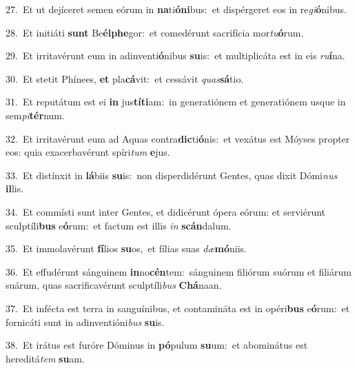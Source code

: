 {\numbfont\textcolor{\numbcolor}{27.}}~Et ut dejíceret semen eórum in \textbf{na}\-ti\-\textbf{ó}\-\textbf{ni}bus:~\star et dispérgeret eos in re\-\textit{gi}\-\textbf{ó}nibus.\par
{\numbfont\textcolor{\numbcolor}{28.}}~Et initiáti \textbf{sunt} Be\-\textbf{él}\-\textbf{phe}gor:~\star et comedérunt sacrifícia mor\-\textit{tu}\-\textbf{ó}rum.\par
{\numbfont\textcolor{\numbcolor}{29.}}~Et irritavérunt eum in adinventi\-\textbf{ó}\-nibus \textbf{su}\-is:~\star et multiplicáta est in eis \textit{ru}\-\textbf{í}na.\par
{\numbfont\textcolor{\numbcolor}{30.}}~Et stetit Phínees, \textbf{et} pla\-\textbf{cá}\-vit:~\star et cessávit \textit{quas}\-\textbf{sá}tio.\par
{\numbfont\textcolor{\numbcolor}{31.}}~Et reputátum est ei \textbf{in} jus\-\textbf{tí}\-\textbf{ti}am:~\star in generatiónem et generatiónem usque in sem\-\textit{pi}\-\textbf{tér}num.\par
{\numbfont\textcolor{\numbcolor}{32.}}~Et irritavérunt eum ad Aquas contra\-\textbf{dic}\-ti\-\textbf{ó}\-nis:~\star et vexátus est Móyses propter eos: quia exacerbavérunt spíri\textit{tum} \textbf{e}\-jus.\par
{\numbfont\textcolor{\numbcolor}{33.}}~Et distínxit in \textbf{lá}\-biis \textbf{su}\-is:~\star non disperdidérunt Gentes, quas dixit Dómi\textit{nus} \textbf{il}\-lis.\par
{\numbfont\textcolor{\numbcolor}{34.}}~Et commísti sunt inter Gentes, et didicérunt ópera eórum: et serviérunt sculptíli\textbf{bus} e\-\textbf{ó}\-rum:~\star et factum est illis \textit{in} \textbf{scán}\-dalum.\par
{\numbfont\textcolor{\numbcolor}{35.}}~Et immolavérunt \textbf{fí}\-lios \textbf{su}\-os,~\star et fílias suas \textit{dæ}\-\textbf{mó}niis.\par
{\numbfont\textcolor{\numbcolor}{36.}}~Et effudérunt sánguinem \textbf{in}\-no\-\textbf{cén}\-tem:~\star sánguinem filiórum suórum et filiárum suárum, quas sacrificavérunt sculptíli\textit{bus} \textbf{Chá}\-naan.\par
{\numbfont\textcolor{\numbcolor}{37.}}~Et infécta est terra in sanguínibus, et contamináta est in opéri\textbf{bus} e\-\textbf{ó}\-rum:~\star et fornicáti sunt in adinventióni\textit{bus} \textbf{su}\-is.\par
{\numbfont\textcolor{\numbcolor}{38.}}~Et irátus est furóre Dóminus in \textbf{pó}\-pulum \textbf{su}\-um:~\star et abominátus est hereditá\textit{tem} \textbf{su}\-am.\par
